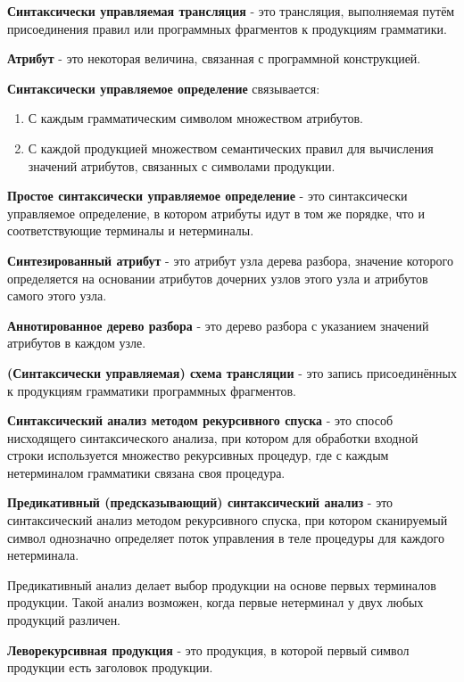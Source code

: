\documentclass[oneside]{book}
\begin{document}
    \textbf{Синтаксически управляемая трансляция} - это трансляция,
    выполняемая путём присоединения правил или программных фрагментов
    к продукциям грамматики.

    \textbf{Атрибут} - это некоторая величина, связанная с программной конструкцией.

    \textbf{Синтаксически управляемое определение} связывается:
    \begin{enumerate}
        \item С каждым грамматическим символом множеством атрибутов.
        \item С каждой продукцией множеством семантических правил для
            вычисления значений атрибутов, связанных с символами продукции.
    \end{enumerate}

    \textbf{Простое синтаксически управляемое определение} - это
    синтаксически управляемое определение, в котором атрибуты идут
    в том же порядке, что и соответствующие терминалы и нетерминалы.

    \textbf{Синтезированный атрибут} - это атрибут узла дерева разбора,
    значение которого определяется на основании атрибутов дочерних узлов
    этого узла и атрибутов самого этого узла.

    \textbf{Аннотированное дерево разбора} - это дерево разбора с указанием значений
    атрибутов в каждом узле.

    \textbf{(Синтаксически управляемая) схема трансляции} - это запись присоединённых
    к продукциям грамматики программных фрагментов.

    \textbf{Синтаксический анализ методом рекурсивного спуска} - это способ
    нисходящего синтаксического анализа, при котором для обработки входной
    строки используется множество рекурсивных процедур, где с каждым нетерминалом
    грамматики связана своя процедура.

    \textbf{Предикативный (предсказывающий) синтаксический анализ} - это
    синтаксический анализ методом рекурсивного спуска, при котором
    сканируемый символ однозначно определяет поток управления в теле
    процедуры для каждого нетерминала.

    Предикативный анализ делает выбор продукции на основе первых терминалов продукции.
    Такой анализ возможен, когда первые нетерминал у двух любых продукций
    различен.

    \textbf{Леворекурсивная продукция} - это продукция, в которой
    первый символ продукции есть заголовок продукции.
\end{document}
